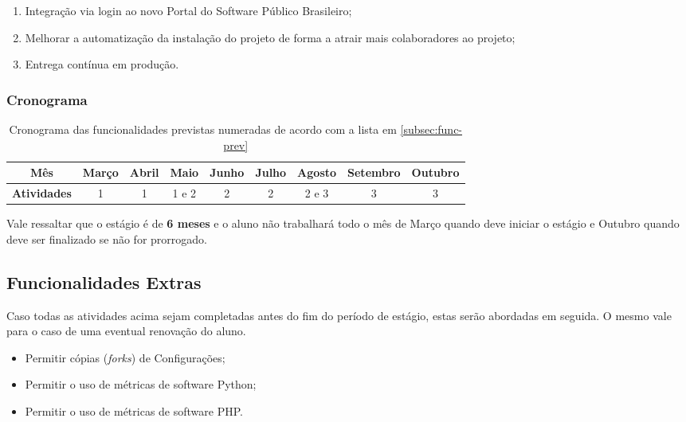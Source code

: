 \documentclass[12pt]{article}
\begin{document}
      \begin{enumerate}
        \item Integração via login ao novo Portal do Software Público Brasileiro;
        \item Melhorar a automatização da instalação do projeto de forma a atrair mais colaboradores ao projeto;
        \item Entrega contínua em produção.
      \end{enumerate}

      \subsubsection{Cronograma}
        \begin{table}[H]
          \begin{tabu}{| c | c | c | c | c | c | c | c | c |}
            \hline
            \textbf{Mês} & Março & Abril & Maio & Junho & Julho & Agosto & Setembro & Outubro \\ \hline
            \textbf{Atividades} & 1 & 1 & 1 e 2 & 2 & 2 & 2 e 3 & 3 & 3 \\ \hline
          \end{tabu}
          \caption{Cronograma das funcionalidades previstas numeradas de acordo com a lista em \ref{subsec:func-prev}}
        \end{table}

        Vale ressaltar que o estágio é de \textbf{6 meses} e o aluno não trabalhará todo o mês de Março quando deve iniciar o estágio e Outubro quando deve ser finalizado se não for prorrogado.

    \subsection{Funcionalidades Extras}
      Caso todas as atividades acima sejam completadas antes do fim do período de estágio, estas serão abordadas em seguida. O mesmo vale para o caso de uma eventual renovação do aluno.

      \begin{itemize}
        \item Permitir cópias (\textit{forks}) de Configurações;
        \item Permitir o uso de métricas de software Python;
        \item Permitir o uso de métricas de software PHP.
      \end{itemize}
\end{document}
